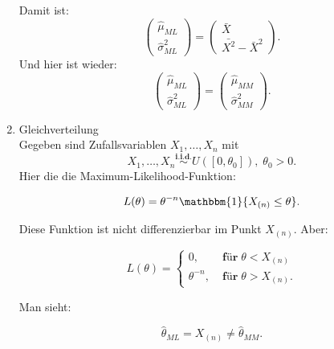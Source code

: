 \documentclass[10pt]{article}
\newcommand{\FZV}{X_1, \ldots, X_n} %
\newenvironment{BSP}[1][]
{\begin{Beispiel}[frametitle=#1]}{\end{Beispiel}}
\begin{document}
\begin{BSP}[Beispiel 1.3.8 (Maximum-Likelihood)]
\begin{enumerate}[label = (\roman*)]
			Damit ist:
			\begin{equation*}
				\left(
				\begin{array}{c}
					\hat{\mu}_{ML}\\
					\hat{\sigma}^2_{ML}
				\end{array}\right)
				=
				\left(
				\begin{array}{c}
					\bar{X}\\
					\bar{X^2}-\bar{X}^2
				\end{array}
				\right).
			\end{equation*}
			Und hier ist wieder:
			\begin{equation*}
				\left(
				\begin{array}{c}
					\hat{\mu}_{ML}\\
					\hat{\sigma}^2_{ML}
				\end{array}\right)
				=
				\left(
				\begin{array}{c}
					\hat{\mu}_{MM}\\
					\hat{\sigma}^2_{MM}
				\end{array}
				\right).
			\end{equation*}
			
			
			\item Gleichverteilung\\
			Gegeben sind Zufallsvariablen $\FZV$ mit
			\begin{equation*}
				\FZV \overset{\textbf{i.i.d.}}{\sim} U([0,\theta_0]), \; \theta_0 >0.
			\end{equation*}
			Hier die die Maximum-Likelihood-Funktion:
			
			\begin{equation*}
				L(\theta)=\theta^{-n}\mathbbm{1} \{X_{(n)}\leq  \theta \}.
			\end{equation*}
			
			Diese Funktion ist nicht differenzierbar im Punkt $X_{(n)}$. Aber:
			
			\begin{equation*}
				L(\theta) =
				\begin{cases}
					0, \;&\textbf{für}\; \theta < X_{(n)}\\
					\theta^{-n}, \; &\textbf{für} \; \theta > X_{(n)}.
				\end{cases}
			\end{equation*}
			
			Man sieht:
			
			\begin{equation*}
				\hat{\theta}_{ML} = X_{(n)} \neq \hat{\theta}_{MM}.
			\end{equation*}
		\end{enumerate}
		
	\end{BSP}
	
\end{document}
